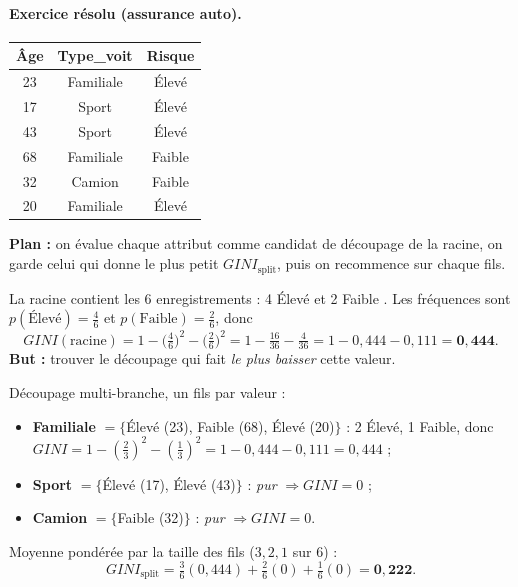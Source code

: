 \paragraph{Exercice résolu (assurance auto).}
\begin{center}\small
\begin{tabular}{ccc}
\toprule
Âge & Type\_voit & Risque\\
\midrule
23 & Familiale & Élevé\\ 17 & Sport & Élevé\\ 43 & Sport & Élevé\\
68 & Familiale & Faible\\ 32 & Camion & Faible\\ 20 & Familiale & Élevé\\
\bottomrule
\end{tabular}
\end{center}

\textbf{Plan :} on évalue chaque attribut comme candidat de découpage de la racine, on garde
celui qui donne le plus petit $GINI_{\text{split}}$, puis on recommence sur chaque fils.

\begin{Calcul}
La racine contient les 6 enregistrements : 4 \og Élevé \fg{} et 2 \og Faible \fg{}. Les
fréquences sont $p(\text{Élevé})=\tfrac46$ et $p(\text{Faible})=\tfrac26$, donc
\[ GINI(\text{racine})=1-\Big(\tfrac46\Big)^2-\Big(\tfrac26\Big)^2
   =1-\tfrac{16}{36}-\tfrac{4}{36}=1-0{,}444-0{,}111=\mathbf{0{,}444}. \]
\textbf{But :} trouver le découpage qui fait \emph{le plus baisser} cette valeur.
\end{Calcul}

\begin{Calcul}
Découpage multi-branche, un fils par valeur :
\begin{itemize}[nosep,leftmargin=1.4em]
  \item \textbf{Familiale} $=\{$Élevé (23), Faible (68), Élevé (20)$\}$ : 2 Élevé, 1 Faible,
        donc $GINI=1-(\tfrac23)^2-(\tfrac13)^2=1-0{,}444-0{,}111=0{,}444$ ;
  \item \textbf{Sport} $=\{$Élevé (17), Élevé (43)$\}$ : \emph{pur} $\Rightarrow GINI=0$ ;
  \item \textbf{Camion} $=\{$Faible (32)$\}$ : \emph{pur} $\Rightarrow GINI=0$.
\end{itemize}
Moyenne pondérée par la taille des fils ($3,2,1$ sur $6$) :
\[ GINI_{\text{split}}=\tfrac36(0{,}444)+\tfrac26(0)+\tfrac16(0)=\mathbf{0{,}222}. \]
\end{Calcul}

